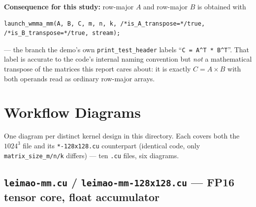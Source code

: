 \documentclass[11pt]{article}
\begin{document}
\textbf{Consequence for this study:} row-major $A$ and row-major $B$ is obtained with
\begin{lstlisting}
launch_wmma_mm(A, B, C, m, n, k, /*is_A_transpose=*/true, /*is_B_transpose=*/true, stream);
\end{lstlisting}
--- the branch the demo's own \texttt{print\_test\_header} labels ``\texttt{C = A\^{}T *
B\^{}T}''. That label is accurate to the code's internal naming convention but
\emph{not} a mathematical transpose of the matrices this report cares about: it is
exactly $C = A \times B$ with both operands read as ordinary row-major arrays.

\section{Workflow Diagrams}
\label{sec:workflow}

One diagram per distinct kernel design in this directory. Each covers both
the $1024^3$ file and its \texttt{*-128x128.cu} counterpart (identical
code, only \texttt{matrix\_size\_m/n/k} differs) --- ten \texttt{.cu} files,
six diagrams.

\subsection{\texttt{leimao-mm.cu} / \texttt{leimao-mm-128x128.cu} --- FP16 tensor core, float accumulator}

\begin{center}
\end{center}
\end{document}
